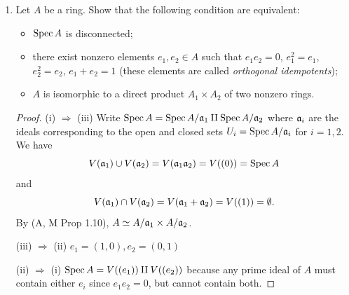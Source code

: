 \documentclass[a4paper]{article}
\begin{document}
\begin{enumerate} [label=\textbf{\arabic*.}, leftmargin=0em]
\item[\textbf{19.}] Let $A$ be a ring. Show that the following condition are equivalent:
\begin{itemize}
    \item[(i)] $\operatorname{Spec}{A}$ is disconnected;
    \item[(ii)] there exist nonzero elements $e_1, e_2 \in A$ such that $e_1 e_2 = 0$, $e_1^2 = e_1$, $e_2^2 = e_2$, $e_1 + e_2 = 1$ (these elements are called \textit{orthogonal idempotents});
    \item[(iii)] $A$ is isomorphic to a direct product $A_1 \times A_2$ of two nonzero rings.
\end{itemize}

\begin{proof}
    (i) $\Rightarrow$ (iii) Write $\operatorname{Spec}{A} = \operatorname{Spec}{A/\mathfrak{a}_1} \amalg \operatorname{Spec}{A/\mathfrak{a}_2}$ where $\mathfrak{a}_i$ are the ideals corresponding to the open and closed sets $U_i = \operatorname{Spec}{A/\mathfrak{a}_i}$ for $i = 1, 2$. We have $$V(\mathfrak{a}_1) \cup V(\mathfrak{a}_2) = V(\mathfrak{a}_1 \mathfrak{a}_2 ) = V((0)) = \operatorname{Spec}{A}$$ and $$V(\mathfrak{a}_1) \cap V(\mathfrak{a}_2) = V(\mathfrak{a}_1 + \mathfrak{a}_2)= V((1)) = \emptyset.$$ By (A, M Prop 1.10), $A \simeq A/\mathfrak{a}_1 \times A/\mathfrak{a}_2$.

    (iii) $\Rightarrow$ (ii) $e_1 = (1, 0), e_2 = (0, 1)$

    (ii) $\Rightarrow$ (i) $\operatorname{Spec}{A} = V((e_1)) \amalg V((e_2))$ because any prime ideal of $A$ must contain either $e_i$ since $e_1 e_2 = 0$, but cannot contain both.
\end{proof}

\end{enumerate}
\end{document}
